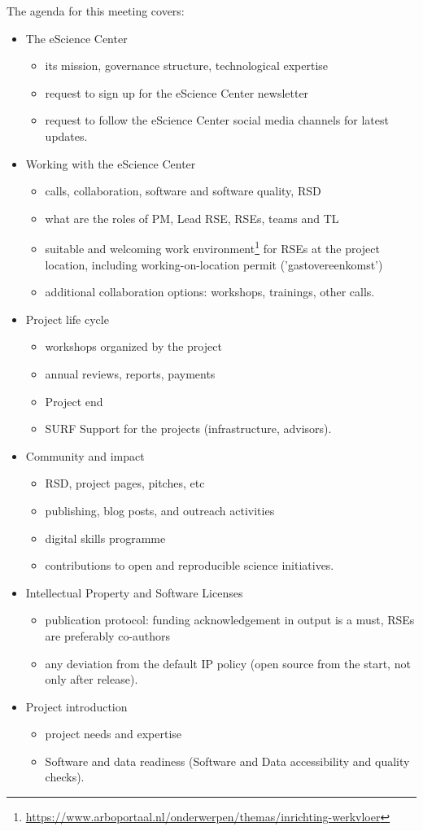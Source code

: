 \documentclass[11pt]{article}
\begin{document}
The agenda for this meeting covers:

\begin{itemize}
\item The eScience Center
\begin{itemize}
\item its mission, governance structure, technological expertise
\item request to sign up for the eScience Center newsletter
\item request to follow the eScience Center social media channels for latest updates.
\end{itemize}
\item Working with the eScience Center
\begin{itemize}
\item calls, collaboration, software and software quality, RSD
\item what are the roles of PM, Lead RSE, RSEs, teams and TL
\item suitable and welcoming work environment\footnote{\url{https://www.arboportaal.nl/onderwerpen/themas/inrichting-werkvloer}} for RSEs at the project location, including
working-on-location permit ('gastovereenkomst')
\item additional collaboration options: workshops, trainings, other calls.
\end{itemize}
\item Project life cycle
\begin{itemize}
\item workshops organized by the project
\item annual reviews, reports, payments
\item Project end
\item SURF Support for the projects (infrastructure, advisors).
\end{itemize}
\item Community and impact
\begin{itemize}
\item RSD, project pages, pitches, etc
\item publishing, blog posts, and outreach activities
\item digital skills programme
\item contributions to open and reproducible science initiatives.
\end{itemize}
\item Intellectual Property and Software Licenses
\begin{itemize}
\item publication protocol: funding acknowledgement in output is a must, RSEs are preferably co-authors
\item any deviation from the default IP policy (open source from the start, not only after release).
\end{itemize}
\item Project introduction
\begin{itemize}
\item project needs and expertise
\item Software and data readiness (Software and Data accessibility and quality checks).
\end{itemize}
\end{itemize}
\end{document}
